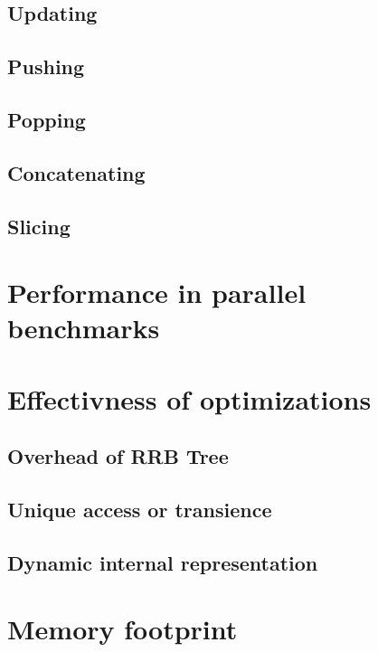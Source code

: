 \subsection{Updating}
\subsection{Pushing}
\subsection{Popping}
\subsection{Concatenating}
\subsection{Slicing}

\section{Performance in parallel benchmarks}
\section{Effectivness of optimizations}
\subsection{Overhead of RRB Tree}
\subsection{Unique access or transience}
\subsection{Dynamic internal representation}
\section{Memory footprint}


